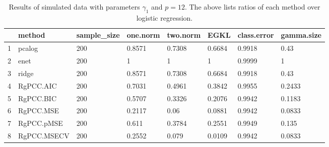 \begin{table}[ht]
\centering
\begin{tabular}{rlllllll}
  \hline
 & method & sample\_size & one.norm & two.norm & EGKL & class.error & gamma.size \\ 
  \hline
1 & pcalog & 200 & 0.8571 & 0.7308 & 0.6684 & 0.9918 & 0.43 \\ 
  2 & enet & 200 & 1 & 1 & 1 & 0.9999 & 1 \\ 
  3 & ridge & 200 & 0.8571 & 0.7308 & 0.6684 & 0.9918 & 0.43 \\ 
  4 & RgPCC.AIC & 200 & 0.7031 & 0.4961 & 0.3842 & 0.9955 & 0.2433 \\ 
  5 & RgPCC.BIC & 200 & 0.5707 & 0.3326 & 0.2076 & 0.9942 & 0.1183 \\ 
  6 & RgPCC.MSE & 200 & 0.2117 & 0.06 & 0.0881 & 0.9942 & 0.0833 \\ 
  7 & RgPCC.pMSE & 200 & 0.611 & 0.3784 & 0.2551 & 0.9949 & 0.135 \\ 
  8 & RgPCC.MSECV & 200 & 0.2552 & 0.079 & 0.0109 & 0.9942 & 0.0833 \\ 
   \hline
\end{tabular}
\caption{Results of simulated data with parameters $\gamma_1$ and $p =12$. The above lists ratios of each method over logistic regression.} 
\label{fig-1-200-lead-12-metrics-pratio}
\end{table}
